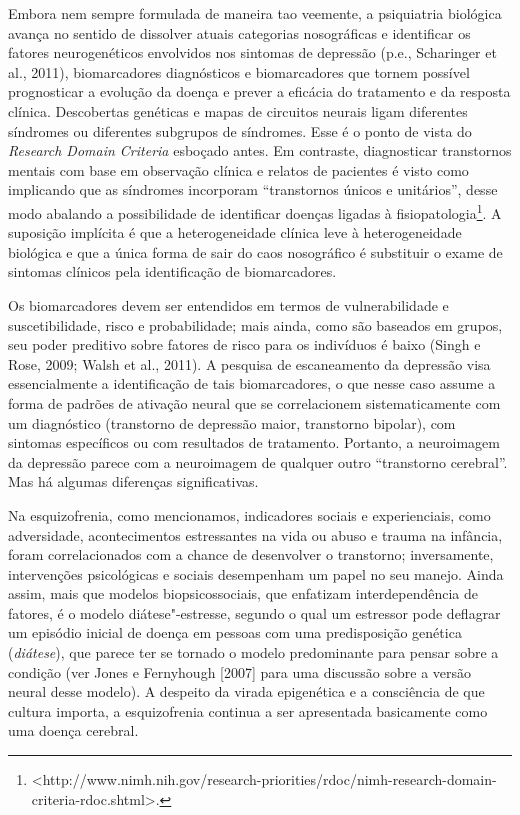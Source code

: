 Embora nem sempre formulada de maneira tao veemente, a psiquiatria
biológica avança no sentido de dissolver atuais categorias nosográficas
e identificar os fatores neurogenéticos envolvidos nos sintomas de
depressão (p.e., Scharinger et al., 2011), biomarcadores diagnósticos e
biomarcadores que tornem possível prognosticar a evolução da doença e
prever a eficácia do tratamento e da resposta clínica. Descobertas
genéticas e mapas de circuitos neurais ligam diferentes síndromes ou
diferentes subgrupos de síndromes. Esse é o ponto de vista do
\emph{Research Domain Criteria} esboçado antes. Em contraste,
diagnosticar transtornos mentais com base em observação clínica e
relatos de pacientes é visto como implicando que as síndromes incorporam
``transtornos únicos e unitários'', desse modo abalando a possibilidade
de identificar doenças ligadas à fisiopatologia\footnote[4]{\textless{}http://www.nimh.nih.gov/research-priorities/rdoc/nimh-research-domain-criteria-rdoc.shtml\textgreater{}.}. A
suposição implícita é que a heterogeneidade clínica leve à
heterogeneidade biológica e que a única forma de sair do caos
nosográfico é substituir o exame de sintomas clínicos pela identificação
de biomarcadores.

Os biomarcadores devem ser entendidos em termos de vulnerabilidade e
suscetibilidade, risco e probabilidade; mais ainda, como são baseados em
grupos, seu poder preditivo sobre fatores de risco para os indivíduos é
baixo (Singh e Rose, 2009; Walsh et al., 2011). A pesquisa de
escaneamento da depressão visa essencialmente a identificação de tais
biomarcadores, o que nesse caso assume a forma de padrões de ativação
neural que se correlacionem sistematicamente com um diagnóstico
(transtorno de depressão maior, transtorno bipolar), com sintomas
específicos ou com resultados de tratamento. Portanto, a neuroimagem da
depressão parece com a neuroimagem de qualquer outro ``transtorno
cerebral''. Mas há algumas diferenças significativas.

Na esquizofrenia, como mencionamos, indicadores sociais e experienciais,
como adversidade, acontecimentos estressantes na vida ou abuso e trauma
na infância, foram correlacionados com a chance de desenvolver o
transtorno; inversamente, intervenções psicológicas e sociais
desempenham um papel no seu manejo. Ainda assim, mais que modelos
biopsicossociais, que enfatizam interdependência de fatores, é o modelo
diátese"-estresse, segundo o qual um estressor pode deflagrar um episódio
inicial de doença em pessoas com uma predisposição genética
(\emph{diátese}), que parece ter se tornado o modelo predominante para
pensar sobre a condição (ver Jones e Fernyhough {[}2007{]} para uma
discussão sobre a versão neural desse modelo). A despeito da virada
epigenética e a consciência de que cultura importa, a esquizofrenia
continua a ser apresentada basicamente como uma doença cerebral.

